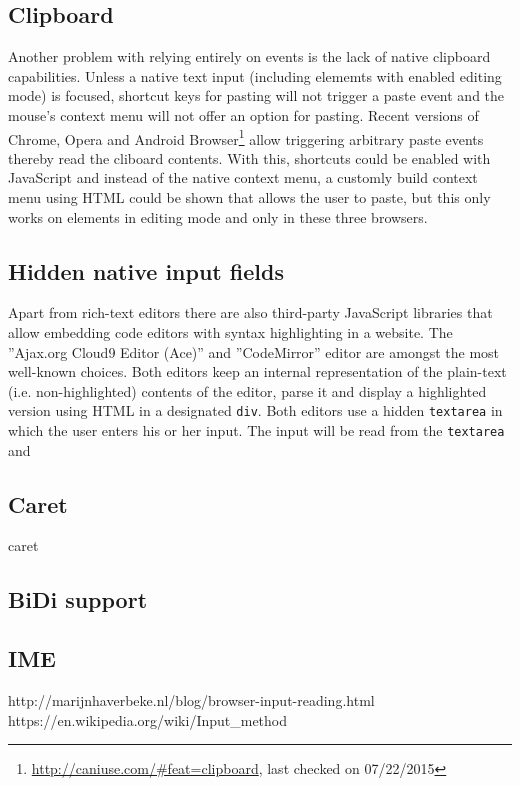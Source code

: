 \subsection{Clipboard} Another problem with relying entirely on events is the lack of native clipboard capabilities. Unless a native text input (including elememts with enabled editing mode) is focused, shortcut keys for pasting will not trigger a paste event and the mouse's context menu will not offer an option for pasting. Recent versions of Chrome, Opera and Android Browser\footnote{\url{http://caniuse.com/\#feat=clipboard}, last checked on 07/22/2015} allow triggering arbitrary paste events thereby read the cliboard contents. With this, shortcuts could be enabled with JavaScript and instead of the native context menu, a customly build context menu using HTML could be shown that allows the user to paste, but this only works on elements in editing mode and only in these three browsers.

\subsection{Hidden native input fields} Apart from rich-text editors there are also third-party JavaScript libraries that allow embedding code editors with syntax highlighting in a website. The ''Ajax.org Cloud9 Editor (Ace)'' and ''CodeMirror'' editor are amongst the most well-known choices. Both editors keep an internal representation of the plain-text (i.e. non-highlighted) contents of the editor, parse it and display a highlighted version using HTML in a designated \texttt{div}. Both editors use a hidden \texttt{textarea} in which the user enters his or her input. The input will be read from the \texttt{textarea} and


\subsection{Caret}
caret
\subsection{BiDi support}
\subsection{IME} 
http://marijnhaverbeke.nl/blog/browser-input-reading.html 
https://en.wikipedia.org/wiki/Input\_method


